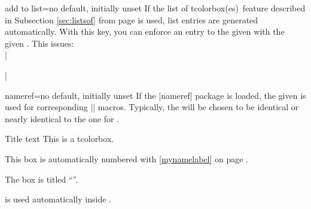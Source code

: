 \begin{docTcbKey}{add to list}{=}{no default, initially unset}
If the \flqq list of tcolorbox(es)\frqq\ feature described in Subsection
\ref{sec:listsof} from page \pageref{sec:listsof} is used, list entries are
generated automatically. With this key, you can enforce an entry to the
given  with the given .
This issues:\\
|\addcontentsline|
\end{docTcbKey}


\begin{docTcbKey}[][doc new and updated={2016-06-22}{2016-11-18}]{nameref}{=}{no default, initially unset}
If the |nameref| package is loaded, the given  is used for
corresponding |\nameref| macros. Typically, the  will be chosen
to be identical or nearly identical to the one for .


\begin{dispExample}
\begin{pabox}[label={mynamelabel},nameref={Title or anything else}]{Title text}
This is a tcolorbox.
\end{pabox}
This box is automatically numbered with \ref{mynamelabel} on page
\pageref{mynamelabel}.

The box is titled \enquote{}.
\end{dispExample}

\begin{marker}
 is used automatically inside .
\end{marker}

\end{docTcbKey}

\clearpage
{}



